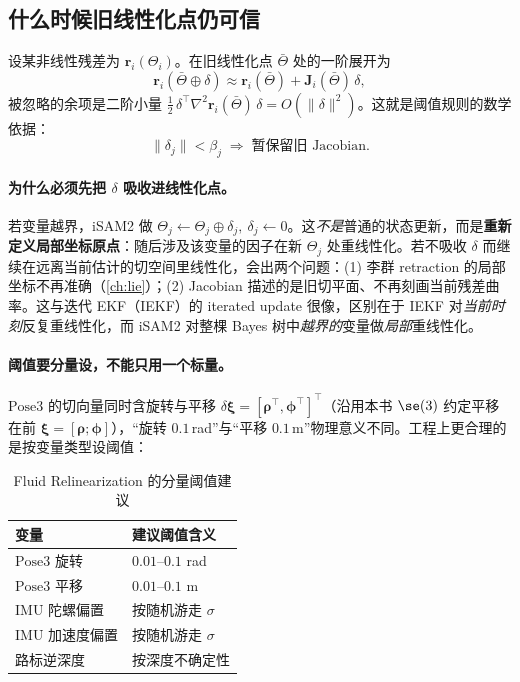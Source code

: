 \subsection{什么时候旧线性化点仍可信}
\label{sec:isam-fluid-math}

设某非线性残差为 $\mathbf{r}_i(\Theta_i)$。在旧线性化点 $\bar\Theta$ 处的一阶展开为
\begin{equation}
  \mathbf{r}_i(\bar\Theta\oplus\delta)\approx\mathbf{r}_i(\bar\Theta)+\mathbf{J}_i(\bar\Theta)\,\delta,
  \label{eq:relin-taylor}
\end{equation}
被忽略的余项是二阶小量 $\tfrac12\,\delta^\top\nabla^2\mathbf{r}_i(\bar\Theta)\,\delta=O(\|\delta\|^2)$。这就是阈值规则的数学依据：
\begin{equation}
  \|\delta_j\|<\beta_j\;\Longrightarrow\;\text{暂保留旧 Jacobian}.
  \label{eq:relin-threshold}
\end{equation}

\paragraph{为什么必须先把 $\delta$ 吸收进线性化点。}
若变量越界，iSAM2 做 $\Theta_j\leftarrow\Theta_j\oplus\delta_j,\ \delta_j\leftarrow 0$。这\emph{不是}普通的状态更新，而是\textbf{重新定义局部坐标原点}：随后涉及该变量的因子在新 $\Theta_j$ 处重线性化。若不吸收 $\delta$ 而继续在远离当前估计的切空间里线性化，会出两个问题：(1) 李群 retraction 的局部坐标不再准确（\cref{ch:lie}）；(2) Jacobian 描述的是旧切平面、不再刻画当前残差曲率。这与迭代 EKF（IEKF）的 iterated update 很像，区别在于 IEKF 对\emph{当前时刻}反复重线性化，而 iSAM2 对整棵 Bayes 树中\emph{越界的}变量做\emph{局部}重线性化。

\paragraph{阈值要分量设，不能只用一个标量。}
$\mathrm{Pose3}$ 的切向量同时含旋转与平移 $\delta\boldsymbol{\xi}=[\boldsymbol{\rho}^\top,\boldsymbol{\phi}^\top]^\top$（沿用本书 $\se(3)$ 约定平移在前 $\boldsymbol{\xi}=[\boldsymbol{\rho};\boldsymbol{\phi}]$），“旋转 $0.1$\,rad”与“平移 $0.1$\,m”物理意义不同。工程上更合理的是按变量类型设阈值：

\begin{table}[H]\centering\small
\caption{Fluid Relinearization 的分量阈值建议}
\label{tab:relin-threshold}
\begin{tabular}{ll}
\toprule
变量 & 建议阈值含义 \\
\midrule
$\mathrm{Pose3}$ 旋转 & $0.01$--$0.1$ rad \\
$\mathrm{Pose3}$ 平移 & $0.01$--$0.1$ m \\
IMU 陀螺偏置 & 按随机游走 $\sigma$ \\
IMU 加速度偏置 & 按随机游走 $\sigma$ \\
路标逆深度 & 按深度不确定性 \\
\bottomrule
\end{tabular}
\end{table}

